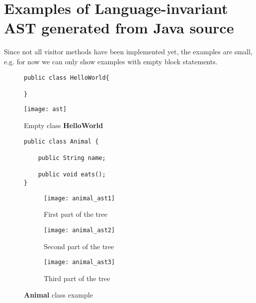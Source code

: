 \documentclass[a4paper]{article}
\begin{document}
\section{Examples of Language-invariant AST generated from Java source}
\label{sec:examples}

Since not all visitor methods have been implemented yet, the examples are small, e.g. for now we can only show examples with empty block statements.

\begin{figure}[h!]
\begin{center}
\begin{lstlisting}
public class HelloWorld{

}
\end{lstlisting}

\texttt{[image: ast]}
\caption{Empty class \textbf{HelloWorld}}
\label{fig:ast1}
\end{center}
\end{figure}

\begin{figure}[h!]
\begin{center}
\begin{lstlisting}
public class Animal {

	public String name;
	
	public void eats();
}
\end{lstlisting}
     \centering
     \begin{subfigure}[b]{\textwidth}
         \centering
         \texttt{[image: animal\_ast1]}
         \caption{First part of the tree}
     \end{subfigure}
     \quad
     \begin{subfigure}[b]{\textwidth}
         \centering
         \texttt{[image: animal\_ast2]}
         \caption{Second part of the tree}
     \end{subfigure}
     \begin{subfigure}[b]{\textwidth}
         \centering
         \texttt{[image: animal\_ast3]}
         \caption{Third part of the tree}
     \end{subfigure}

\caption{\textbf{Animal} class example}
\label{fig:ast3}
\end{center}
\end{figure}
\end{document}
